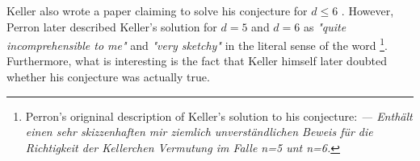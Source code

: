 \documentclass[../thesis.tex]{subfiles}
\begin{document}
\begin{remark}
    Keller also wrote a paper claiming to solve his conjecture for $d\leq 6$ \cite{Keller1937}. However, Perron later described Keller's solution for $d=5$ and $d=6$ as \emph{"quite incomprehensible to me"} and \emph{"very sketchy"} in the literal sense of the word \cite{perronUeberLueckenloseAusfuellung1940} \footnote[1]{Perron's origninal description of Keller's solution to his conjecture: \emph{— Enthält einen sehr skizzenhaften mir ziemlich unverständlichen Beweis für die Richtigkeit der Kellerchen Vermutung im Falle n=5 unt n=6.}}. Furthermore, what is interesting is the fact that Keller himself later doubted whether his conjecture was actually true.
\end{remark}
\end{document}
